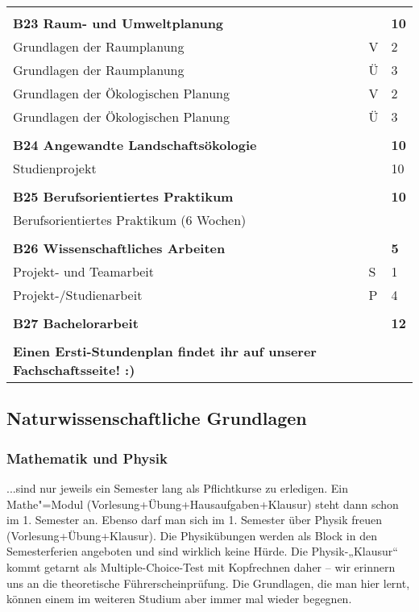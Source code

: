 \begin{longtable}{p{} p{} p{}}
&&\\
\textbf{B23 Raum- und Umweltplanung}&&\textbf{10}\\
Grundlagen der Raumplanung & V & 2\\
Grundlagen der Raumplanung & Ü & 3\\
Grundlagen der Ökologischen Planung & V & 2\\
Grundlagen der Ökologischen Planung & Ü & 3\\
&&\\
\textbf{B24 Angewandte Landschaftsökologie} && \textbf{10}\\
Studienprojekt & & 10\\
&&\\
\textbf{B25 Berufsorientiertes Praktikum} & & \textbf{10}\\
Berufsorientiertes Praktikum (6 Wochen) \\
&&\\
\textbf{B26 Wissenschaftliches Arbeiten} & & \textbf{5}\\
Projekt- und Teamarbeit & S & 1\\
Projekt-/Studienarbeit & P & 4\\
&&\\
\textbf{B27 Bachelorarbeit} && \textbf{12}\\
&&\\
\textbf{Einen Ersti-Stundenplan findet ihr auf unserer Fachschaftsseite! :)}
\end{longtable}

\subsection*{Naturwissenschaftliche Grundlagen}
\subsubsection*{Mathematik und Physik}
...sind nur jeweils ein Semester lang als Pﬂichtkurse zu erledigen. Ein Mathe"=Modul (Vorlesung+Übung+Hausaufgaben+Klausur) steht dann schon im 1. Semester an. Ebenso darf man sich im 1. Semester über Physik freuen (Vorlesung+Übung+Klausur). Die Physikübungen werden als Block in den Semesterferien angeboten und sind wirklich keine Hürde. Die Physik-„Klausur“ kommt getarnt als Multiple-Choice-Test mit Kopfrechnen daher – wir erinnern uns an die theoretische Führerscheinprüfung. Die Grundlagen, die man hier lernt, können einem im weiteren Studium aber immer mal wieder begegnen.

